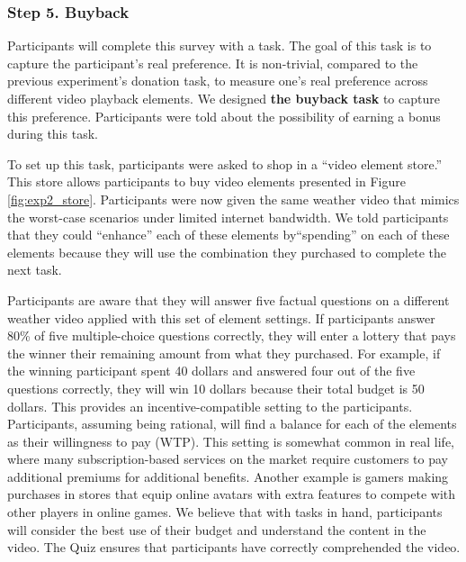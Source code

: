 \subsubsection{Step 5. Buyback}
Participants will complete this survey with a task. The goal of this task is to capture the participant's real preference. It is non-trivial, compared to the previous experiment's donation task, to measure one's real preference across different video playback elements. We designed \textbf{the buyback task} to capture this preference. Participants were told about the possibility of earning a bonus during this task.

To set up this task, participants were asked to shop in a ``video element store.'' This store allows participants to buy video elements presented in Figure \ref{fig:exp2_store}. Participants were now given the same weather video that mimics the worst-case scenarios under limited internet bandwidth.
We told participants that they could ``enhance'' each of these elements by``spending'' on each of these elements because they will use the combination they purchased to complete the next task. 

Participants are aware that they will answer five factual questions on a different weather video applied with this set of element settings. If participants answer 80\% of five multiple-choice questions correctly, they will enter a lottery that pays the winner their remaining amount from what they purchased. For example, if the winning participant spent 40 dollars and answered four out of the five questions correctly, they will win 10 dollars because their total budget is 50 dollars. This provides an incentive-compatible setting to the participants. Participants, assuming being rational, will find a balance for each of the elements as their willingness to pay (WTP). This setting is somewhat common in real life, where many subscription-based services on the market require customers to pay additional premiums for additional benefits. Another example is gamers making purchases in stores that equip online avatars with extra features to compete with other players in online games. We believe that with tasks in hand, participants will consider the best use of their budget and understand the content in the video. The Quiz ensures that participants have correctly comprehended the video.

